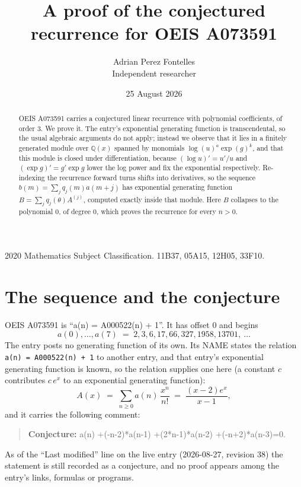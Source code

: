 \documentclass[11pt,a4paper]{article}
\title{A proof of the conjectured recurrence for OEIS A073591}
\author{Adrian Perez Fontelles\\ \small Independent researcher}
\date{25 August 2026}
\theoremstyle{plain}
\theoremstyle{definition}
\begin{document}
\maketitle

\begin{abstract}
OEIS A073591 carries a conjectured linear recurrence with polynomial coefficients, of
order 3. We prove it. The entry's exponential generating function is
transcendental, so the usual algebraic arguments do not apply; instead we observe that it
lies in a finitely generated module over $\mathbb{Q}(x)$ spanned by monomials
$\log(u)^{a}\exp(g)^{k}$, and that this module is closed under differentiation, because
$(\log u)'=u'/u$ and $(\exp g)'=g'\exp g$ lower the log power and fix the exponential
respectively. Re-indexing the recurrence forward turns shifts into derivatives, so the
sequence $b(m)=\sum_{j}q_{j}(m)a(m+j)$ has exponential generating function
$B=\sum_{j}q_{j}(\theta)A^{(j)}$, computed exactly inside that module. Here $B$ collapses
to the polynomial $0$, of degree $0$, which proves the recurrence for every
$n>0$.
\end{abstract}

\noindent\small 2020 Mathematics Subject Classification. 11B37, 05A15, 12H05, 33F10.\normalsize

\section{The sequence and the conjecture}

OEIS A073591 is ``a(n) = A000522(n) + 1''. It has offset $0$ and begins
\[
a(0),\dots,a(7)\;=\;2, 3, 6, 17, 66, 327, 1958, 13701,\ \dots
\]
The entry posts no generating function of its own. Its NAME states the
relation \texttt{a(n) = A000522(n) + 1} to another entry, and that entry's exponential generating
function is known, so the relation supplies one here (a constant $c$ contributes
$c\,e^{x}$ to an exponential generating function):
\begin{equation}\label{eq:gf}
A(x)\;=\;\sum_{n\ge 0} a(n)\,\frac{x^{n}}{n!}\;=\;\frac{\left(x - 2\right) e^{x}}{x - 1} ,
\end{equation}
and it carries the following comment:
\begin{quote}\small
\textbf{Conjecture:} a(n) +(-n-2)*a(n-1) +(2*n-1)*a(n-2) +(-n+2)*a(n-3)=0.
\end{quote}
As of the ``Last modified'' line on the live entry (2026-08-27, revision 38) the
statement is still recorded as a conjecture, and no proof appears among the entry's links,
formulas or programs.
\end{document}
